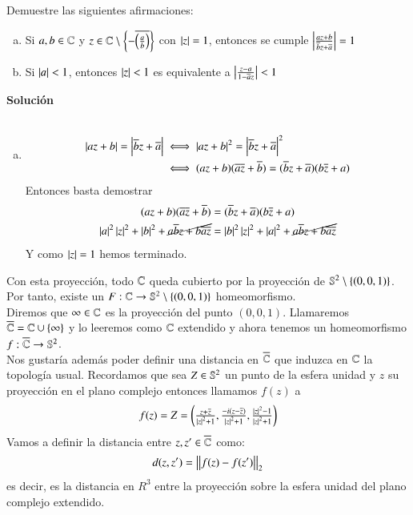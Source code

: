     \begin{ex}[H1.5]
        Demuestre las siguientes afirmaciones:
        \begin{enumerate}[a)]
            \item Si $a, b \in \C$ y $z \in \C\setminus\sdf{-\cnj{\pfrac{a}{b}}}$ con $\vabs{z} = 1$, entonces se cumple $\vabs{\frac{az+b}{\cnj b z + \cnj a}} = 1$
            \item Si $\vabs{a} < 1$, entonces $\vabs{z} < 1$ es equivalente a $\vabs{\frac{z-a}{1-\cnj a z}} < 1$
        \end{enumerate}
        \textbf{Solución}\\\\
        \begin{enumerate}[a)]
            \item
                \begin{align*}
                    \vabs{az+b} = \vabs{\cnj b z + \cnj a} &\iff \vabs{az+b}^2 = \vabs{\cnj b z + \cnj a}^2\\
                    &\iff (az + b)(\cnj a \cnj z + \cnj b) = (\cnj b z + \cnj a)(b \cnj z + a)
                \end{align*}
                Entonces basta demostrar
                \begin{align*}
                    (az + b)(\cnj a \cnj z + \cnj b) &= (\cnj b z + \cnj a)(b \cnj z + a)\\
                     \vabs{a}^2 \vabs{z}^2 + \vabs{b}^2 + \cancel{a\cnj b z + b \cnj a \cnj z} &= \vabs{b}^2 \vabs{z}^2 + \vabs{a}^2 + \cancel{a\cnj b z + b \cnj a \cnj z}
                \end{align*}
                Y como $\vabs{z} = 1$ hemos terminado.
        \end{enumerate}
    \end{ex}


    Con esta proyección, todo $\C$ queda cubierto por la proyección de $\S^2\setminus\sdf{(0, 0, 1)}$. Por tanto, existe un $F: \C \to \S^2\setminus\sdf{(0, 0, 1)}$ homeomorfismo.\\
    Diremos que $\infty \in \C$ es la proyección del punto $(0, 0, 1)$. Llamaremos $\overline{\C} = \C \cup \sdf{\infty}$ y lo leeremos como $\C$ extendido y ahora tenemos un homeomorfismo $f: \overline{\C} \to \S^2$.\\

    Nos gustaría además poder definir una distancia en $\cnj \C$ que induzca en $\C$ la topología usual. Recordamos que sea $Z \in \S^2$ un punto de la esfera unidad y $z$ su proyección en el plano complejo entonces llamamos $f(z)$ a
    $$
        f(z) = Z = \px{\frac{z+\cnj z}{\vabs{z}^2+1}, \frac{-i(z-\cnj z)}{\vabs{z}^2+1}, \frac{\vabs{z}^2-1}{\vabs{z}^2+1}}
    $$
    Vamos a definir la distancia entre $z, z' \in \cnj \C$ como:
    $$
        d(z, z') = \vabs{\vabs{f(z) - f(z')}}_2
    $$
    es decir, es la distancia en $R^3$ entre la proyección sobre la esfera unidad del plano complejo extendido.

